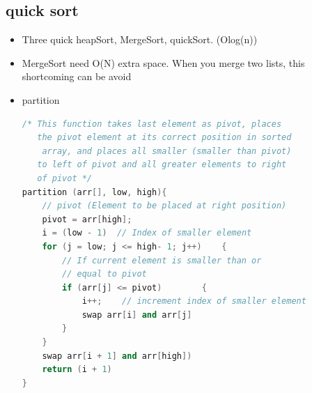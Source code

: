\documentclass[a4paper,12pt,twoside]{book}
\begin{document}
\subsection{quick  sort}
\begin{itemize}
\item Three quick heapSort, MergeSort, quickSort. (Olog(n))
\item MergeSort need O(N) extra space. When you merge two lists, this shortcoming can be avoid

\item partition 
\begin{lstlisting}[frame=single, language=c++]
/* This function takes last element as pivot, places
   the pivot element at its correct position in sorted
    array, and places all smaller (smaller than pivot)
   to left of pivot and all greater elements to right
   of pivot */
partition (arr[], low, high){
    // pivot (Element to be placed at right position)
    pivot = arr[high];   
    i = (low - 1)  // Index of smaller element
    for (j = low; j <= high- 1; j++)    {
        // If current element is smaller than or
        // equal to pivot
        if (arr[j] <= pivot)        {
            i++;    // increment index of smaller element
            swap arr[i] and arr[j]
        }
    }
    swap arr[i + 1] and arr[high])
    return (i + 1)
}
\end{lstlisting}


\end{itemize}
\end{document}
